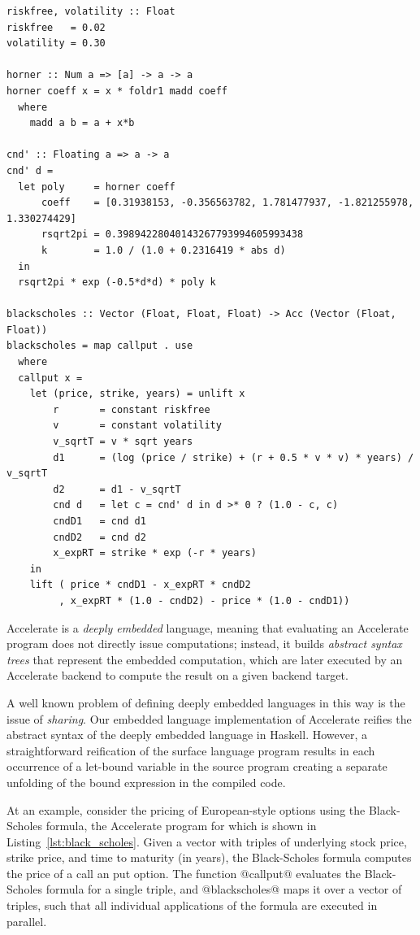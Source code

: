 \begin{lstlisting}[style=haskell
    ,float=tbp
    ,label=lst:black_scholes
    ,caption={Black-Scholes option pricing in Accelerate}]
riskfree, volatility :: Float
riskfree   = 0.02
volatility = 0.30

horner :: Num a => [a] -> a -> a
horner coeff x = x * foldr1 madd coeff
  where
    madd a b = a + x*b

cnd' :: Floating a => a -> a
cnd' d =
  let poly     = horner coeff
      coeff    = [0.31938153, -0.356563782, 1.781477937, -1.821255978, 1.330274429]
      rsqrt2pi = 0.39894228040143267793994605993438
      k        = 1.0 / (1.0 + 0.2316419 * abs d)
  in
  rsqrt2pi * exp (-0.5*d*d) * poly k

blackscholes :: Vector (Float, Float, Float) -> Acc (Vector (Float, Float))
blackscholes = map callput . use
  where
  callput x =
    let (price, strike, years) = unlift x
        r       = constant riskfree
        v       = constant volatility
        v_sqrtT = v * sqrt years
        d1      = (log (price / strike) + (r + 0.5 * v * v) * years) / v_sqrtT
        d2      = d1 - v_sqrtT
        cnd d   = let c = cnd' d in d >* 0 ? (1.0 - c, c)
        cndD1   = cnd d1
        cndD2   = cnd d2
        x_expRT = strike * exp (-r * years)
    in
    lift ( price * cndD1 - x_expRT * cndD2
         , x_expRT * (1.0 - cndD2) - price * (1.0 - cndD1))
\end{lstlisting}

Accelerate is a \emph{deeply embedded} language, meaning that evaluating an
Accelerate program does not directly issue computations; instead, it builds
\emph{abstract syntax trees} that represent the
embedded computation, which are later executed by an Accelerate backend to
compute the result on a given backend target.

A well known problem of defining deeply embedded languages in this way is the issue of
\emph{sharing}. Our embedded language implementation of Accelerate reifies the abstract syntax of
the deeply embedded language in Haskell. However, a straightforward reification of the surface
language program results in each occurrence of a let-bound variable in the source program creating a
separate unfolding of the bound expression in the compiled code.

At an example, consider the pricing of European-style options using the Black-Scholes formula, the
Accelerate program for which is shown in Listing~\ref{lst:black_scholes}. Given a vector with
triples of underlying stock price, strike price, and time to maturity (in years), the Black-Scholes
formula computes the price of a call an put option. The function @callput@ evaluates the
Black-Scholes formula for a single triple, and @blackscholes@ maps it over a vector of triples,
such that all individual applications of the formula are executed in parallel.

